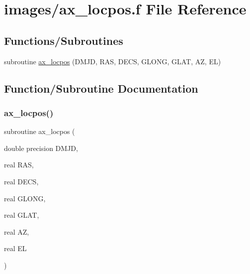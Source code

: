 \hypertarget{ax__locpos_8f}{}\section{images/ax\+\_\+locpos.f File Reference}
\label{ax__locpos_8f}
\subsection*{Functions/\+Subroutines}
\begin{DoxyCompactItemize}
\item 
subroutine \hyperlink{ax__locpos_8f_acfb92f5193c3764d83526601173f9a23}{ax\+\_\+locpos} (D\+M\+JD, R\+AS, D\+E\+CS, G\+L\+O\+NG, G\+L\+AT, AZ, EL)
\end{DoxyCompactItemize}


\subsection{Function/\+Subroutine Documentation}
\mbox{\label{ax__locpos_8f_acfb92f5193c3764d83526601173f9a23}} 
\subsubsection{\texorpdfstring{ax\+\_\+locpos()}{ax\_locpos()}}
{\footnotesize\ttfamily subroutine ax\+\_\+locpos (\begin{DoxyParamCaption}\item[{double precision}]{D\+M\+JD,  }\item[{real}]{R\+AS,  }\item[{real}]{D\+E\+CS,  }\item[{real}]{G\+L\+O\+NG,  }\item[{real}]{G\+L\+AT,  }\item[{real}]{AZ,  }\item[{real}]{EL }\end{DoxyParamCaption})}

